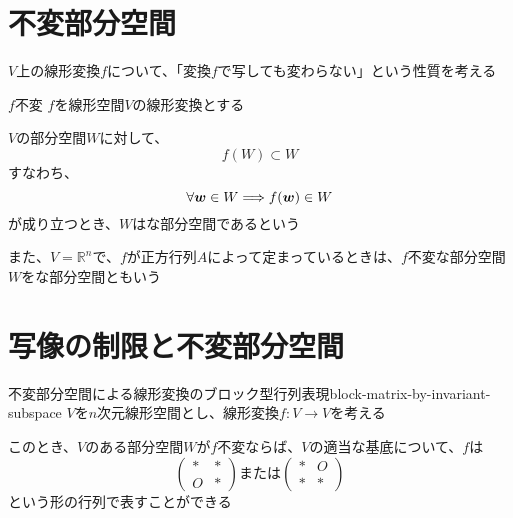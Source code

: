 \documentclass[../../../topic_linear-algebra]{subfiles}
\begin{document}
\sectionline
\section{不変部分空間}

$V$上の線形変換$f$について、「変換$f$で写しても変わらない」という性質を考える

\begin{definition*}{$f$不変}
  $f$を線形空間$V$の線形変換とする

  $V$の部分空間$W$に対して、
  \begin{equation*}
    f(W) \subset W
  \end{equation*}
  すなわち、
  \begin{equation*}
    \forall\vb*{w} \in W \Longrightarrow f(\vb*{w}) \in W
  \end{equation*}
  が成り立つとき、$W$はな部分空間であるという

  \br

  また、$V=\mathbb{R}^n$で、$f$が正方行列$A$によって定まっているときは、$f$不変な部分空間$W$をな部分空間ともいう
\end{definition*}

\sectionline
\section{写像の制限と不変部分空間}

\begin{theorem}{不変部分空間による線形変換のブロック型行列表現}{block-matrix-by-invariant-subspace}
  $V$を$n$次元線形空間とし、線形変換$f\colon V \to V$を考える

  このとき、$V$のある部分空間$W$が$f$不変ならば、$V$の適当な基底について、$f$は
  \begin{equation*}
    \begin{pmatrix}
      * & * \\
      O & *
    \end{pmatrix} \text{または}
    \begin{pmatrix}
      * & O \\
      * & *
    \end{pmatrix}
  \end{equation*}
  という形の行列で表すことができる
\end{theorem}
\end{document}
